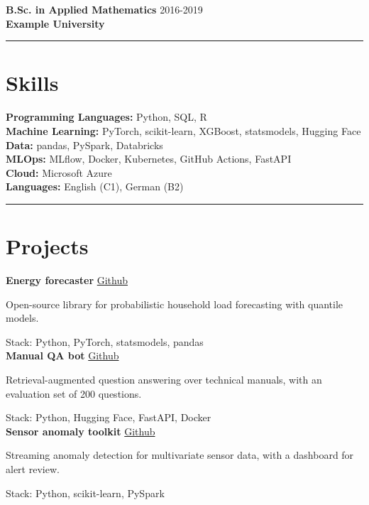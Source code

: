 \noindent \textbf{B.Sc. in Applied Mathematics} \hfill 2016-2019\\
\textbf{Example University}\\
\vspace{0.5\baselineskip}\hrule\vspace{0.5\baselineskip}

\section*{Skills}
\noindent \textbf{Programming Languages:} Python, SQL, R\\
\textbf{Machine Learning:} PyTorch, scikit-learn, XGBoost, statsmodels, Hugging Face\\
\textbf{Data:} pandas, PySpark, Databricks\\
\textbf{MLOps:} MLflow, Docker, Kubernetes, GitHub Actions, FastAPI\\
\textbf{Cloud:} Microsoft Azure\\
\textbf{Languages:} English (C1), German (B2)
\vspace{0.5\baselineskip}\hrule\vspace{0.5\baselineskip}

\section*{Projects}
\noindent \textbf{Energy forecaster} \href{https://github.com/example/energy-forecaster}{Github}

\noindent Open-source library for probabilistic household load forecasting with quantile models.

\noindent Stack: Python, PyTorch, statsmodels, pandas\\

\noindent \textbf{Manual QA bot} \href{https://github.com/example/manual-qa}{Github}

\noindent Retrieval-augmented question answering over technical manuals, with an evaluation set of 200 questions.

\noindent Stack: Python, Hugging Face, FastAPI, Docker\\

\noindent \textbf{Sensor anomaly toolkit} \href{https://github.com/example/sensor-anomaly}{Github}

\noindent Streaming anomaly detection for multivariate sensor data, with a dashboard for alert review.

\noindent Stack: Python, scikit-learn, PySpark\\

